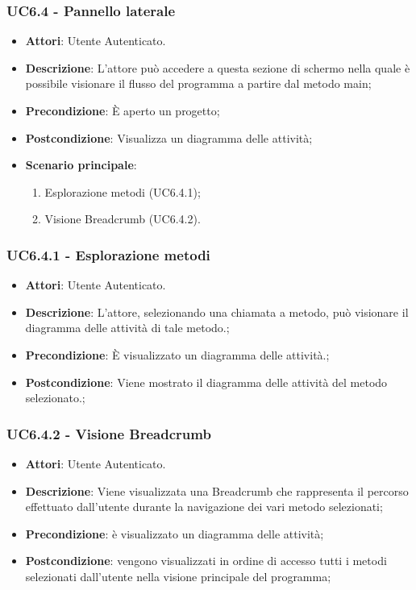\subsubsection{UC6.4 - Pannello laterale} 
\label{sssec:UC6.4} 
\begin{itemize} 
\item \textbf{Attori}: Utente Autenticato.
\item \textbf{Descrizione}: L'attore può accedere a questa sezione di schermo nella quale è possibile visionare il flusso del programma a partire dal metodo main;
\item \textbf{Precondizione}: È aperto un progetto;
\item \textbf{Postcondizione}: Visualizza un diagramma delle attività;
\item \textbf{Scenario principale}: \begin{enumerate}\item Esplorazione metodi (UC6.4.1);\item Visione Breadcrumb (UC6.4.2). 
 \end{enumerate}
\end{itemize} 
\subsubsection{UC6.4.1 - Esplorazione metodi} 
\label{sssec:UC6.4.1} 
\begin{itemize} 
\item \textbf{Attori}: Utente Autenticato.
\item \textbf{Descrizione}: L'attore, selezionando una chiamata a metodo, può visionare il diagramma delle attività di tale metodo.;
\item \textbf{Precondizione}: È visualizzato un diagramma delle attività.;
\item \textbf{Postcondizione}: Viene mostrato il diagramma delle attività del metodo selezionato.;
\end{itemize} 
\subsubsection{UC6.4.2 - Visione Breadcrumb} 
\label{sssec:UC6.4.2} 
\begin{itemize} 
\item \textbf{Attori}: Utente Autenticato.
\item \textbf{Descrizione}: Viene visualizzata una Breadcrumb che rappresenta il percorso effettuato dall'utente durante la navigazione dei vari metodo selezionati;
\item \textbf{Precondizione}: è visualizzato un diagramma delle attività;
\item \textbf{Postcondizione}: vengono visualizzati in ordine di accesso tutti i metodi selezionati dall'utente nella visione principale del programma;
\end{itemize} 
